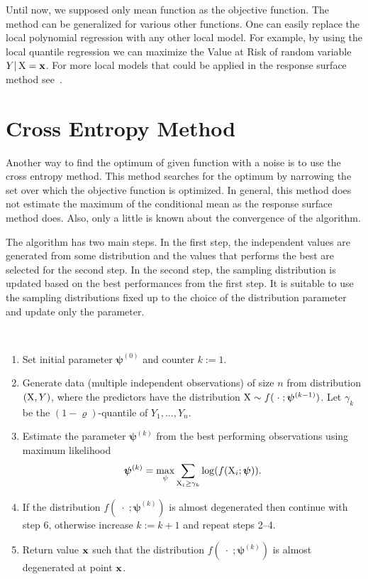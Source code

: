 Until now, we supposed only mean function as the objective function. The method can be generalized for various other functions. One can easily replace the local polynomial regression with any other local model. For example, by using the local quantile regression we can maximize the Value at Risk of random variable $Y \vert \operatorname{\bm{X}} = \mathbf{x}$. For more local models that could be applied in the response surface method see~\cite{Fan03}.



\section{Cross Entropy Method}
	\label{chap:crossEntropy}
	
	Another way to find the optimum of given function with a noise is to use the cross entropy method. This method searches for the optimum by narrowing the set over which the objective function is optimized. In general, this method does not estimate the maximum of the conditional mean as the response surface method does. Also, only a little is known about the convergence of the algorithm.
	
	The algorithm has two main steps. In the first step, the independent values are generated from some distribution and the values that performs the best are selected for the second step. In the second step, the sampling distribution is updated based on the best performances from the first step. It is suitable to use the sampling distributions fixed up to the choice of the distribution parameter and update only the parameter.

\begin{algorithm}\
	\label{algo:crossEntropy}
	\begin{enumerate}
		\item Set initial parameter $\bm{\psi}^{(0)}$ and counter $k := 1$.
		\item Generate data (multiple independent observations) of size $n$ from distribution $(\operatorname{\bm{X}}, Y)$, where the predictors have the distribution $\operatorname{\bm{X}} \sim f( \;\cdot\; ; \bm{\psi}^{(k-1)})$. Let $\gamma_k$ be the $(1-\varrho)$-quantile of $Y_1, ..., Y_n$.
		\item Estimate the parameter $\bm{\psi}^{(k)}$ from the best performing observations using maximum likelihood
		\[
			\bm{\psi}^{(k)} = \underset{\psi}{\max} \sum_{\operatorname{\bm{X}}_i \geq \gamma_k} \log ( f ( \operatorname{\bm{X}}_i; \bm{\psi} ) ).
		\]
		\item If the distribution $f( \;\cdot\; ; \bm{\psi}^{(k)})$ is almost degenerated then continue with step 6, otherwise increase $k := k+1$ and repeat steps 2--4.
		\item Return value $\mathbf{x}$ such that the distribution $f( \;\cdot\; ; \bm{\psi}^{(k)})$ is almost degenerated at point $\mathbf{x}$.
	\end{enumerate}
\end{algorithm}

